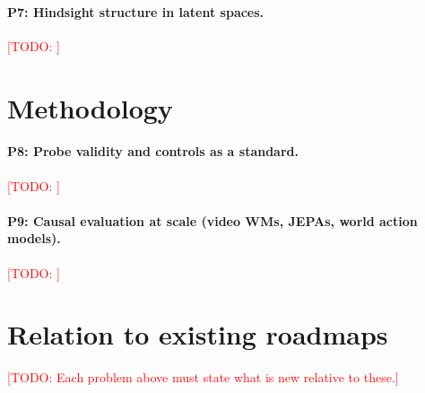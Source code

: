 \documentclass[11pt]{article}
\newcommand{\todo}[1]{\textcolor{red}{[TODO: #1]}}
\begin{document}
\paragraph{P7: Hindsight structure in latent spaces.} \todo{}

\section{Methodology}
\paragraph{P8: Probe validity and controls as a standard.} \citep{hewitt2019control} \todo{}
\paragraph{P9: Causal evaluation at scale (video WMs, JEPAs, world action models).} \todo{}

\section{Relation to existing roadmaps}
\citep{openproblems_mi_2501_16496,wm_roadmap_2607_06401,state_of_mi_2611_08438}
\todo{Each problem above must state what is new relative to these.}



\end{document}
